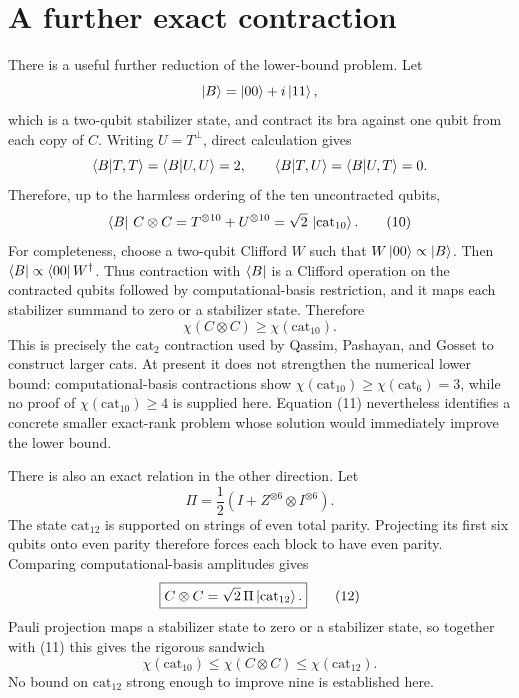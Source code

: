 \documentclass[11pt]{article}
\theoremstyle{definition}
\newcommand{\cat}{\mathrm{cat}}
\begin{document}
\section{A further exact contraction}

There is a useful further reduction of the lower-bound problem. Let
\[
\ket{B}=\ket{00}+i\ket{11},
\]
which is a two-qubit stabilizer state, and contract its bra against one qubit from each copy of $C$. Writing $U=T^\perp$, direct calculation gives
\[
\braket{B|T,T}=\braket{B|U,U}=2,
\qquad
\braket{B|T,U}=\braket{B|U,T}=0.
\]
Therefore, up to the harmless ordering of the ten uncontracted qubits,
\begin{equation}
\bra{B}\,C\otimes C
=T^{\otimes10}+U^{\otimes10}
=\sqrt2\,\ket{\cat_{10}}.
\tag{10}
\end{equation}
For completeness, choose a two-qubit Clifford $W$ such that $W\ket{00}\propto\ket{B}$. Then $\bra{B}\propto\bra{00}W^\dagger$. Thus contraction with $\bra{B}$ is a Clifford operation on the contracted qubits followed by computational-basis restriction, and it maps each stabilizer summand to zero or a stabilizer state. Therefore
\begin{equation}
\chi(C\otimes C)\geq\chi(\cat_{10}).
\tag{11}
\end{equation}
This is precisely the $\cat_2$ contraction used by Qassim, Pashayan, and Gosset to construct larger cats. At present it does not strengthen the numerical lower bound: computational-basis contractions show $\chi(\cat_{10})\geq\chi(\cat_6)=3$, while no proof of $\chi(\cat_{10})\geq4$ is supplied here. Equation (11) nevertheless identifies a concrete smaller exact-rank problem whose solution would immediately improve the lower bound.

There is also an exact relation in the other direction. Let
\[
\Pi=\frac12\left(I+Z^{\otimes6}\otimes I^{\otimes6}\right).
\]
The state $\cat_{12}$ is supported on strings of even total parity. Projecting its first six qubits onto even parity therefore forces each block to have even parity. Comparing computational-basis amplitudes gives
\begin{equation}
\boxed{C\otimes C=\sqrt2\,\Pi\ket{\cat_{12}}.}
\tag{12}
\end{equation}
Pauli projection maps a stabilizer state to zero or a stabilizer state, so together with (11) this gives the rigorous sandwich
\begin{equation}
\chi(\cat_{10})\leq\chi(C\otimes C)
\leq\chi(\cat_{12}).
\tag{13}
\end{equation}
No bound on $\cat_{12}$ strong enough to improve nine is established here.
\end{document}
